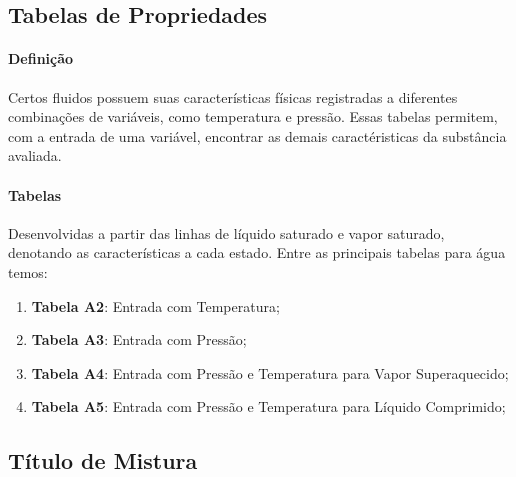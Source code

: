 \documentclass{article}
\begin{document}
        \subsection{Tabelas de Propriedades}
            \paragraph{Definição}Certos fluidos possuem suas características físicas registradas a diferentes combinações de variáveis, como temperatura e pressão. Essas tabelas permitem, com a entrada de uma variável, encontrar as demais caractéristicas da substância avaliada.

            \paragraph{Tabelas}Desenvolvidas a partir das linhas de líquido saturado e vapor saturado, denotando as características a cada estado. Entre as principais tabelas para água temos:
                \begin{enumerate}[noitemsep]
                    \item \textbf{Tabela A2}: Entrada com Temperatura;
                    \item \textbf{Tabela A3}: Entrada com Pressão;
                    \item \textbf{Tabela A4}: Entrada com Pressão e Temperatura para Vapor Superaquecido;
                    \item \textbf{Tabela A5}: Entrada com Pressão e Temperatura para Líquido Comprimido;
                \end{enumerate}

        \subsection{Título de Mistura}
\end{document}
